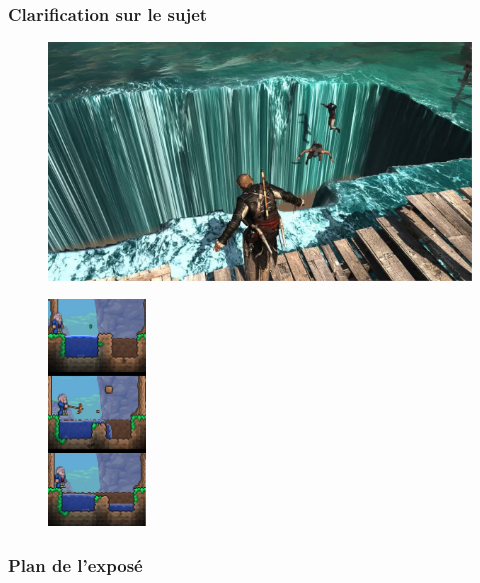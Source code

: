 \begin{frame}
\titlepage 
\end{frame}

\begin{frame}
    \frametitle{Clarification sur le sujet}
    \begin{figure}
        \centering
        \begin{minipage}{.5\textwidth}
            \centering
            \includegraphics{figures/black_flag_not_water_simulation.jpg}
            \label{fig:test1}
        \end{minipage}%
        \begin{minipage}{.5\textwidth}
            \centering
            \includegraphics[height=6cm]{figures/terrarria_fluid_sim.png}
            \label{fig:test2}
        \end{minipage}
    \end{figure}
\end{frame}

\begin{frame}
\frametitle{Plan de l'exposé} 
\tableofcontents 
\end{frame}
